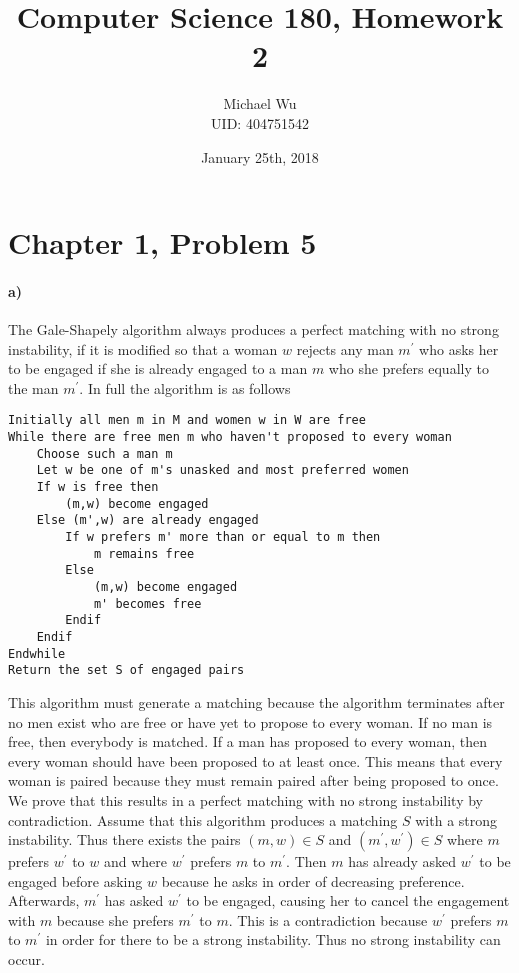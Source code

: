 \documentclass[12pt]{article}
\begin{document}
\title{Computer Science 180, Homework 2}
\date{January 25th, 2018}
\author{Michael Wu\\UID: 404751542}
\maketitle

\section*{Chapter 1, Problem 5}

\paragraph{a)}

The Gale-Shapely algorithm always produces a perfect matching with no strong instability,
if it is modified so that a woman \(w\) rejects any man \(m^\prime\) who asks her to be engaged
if she is already engaged to a man \(m\) who she prefers equally to the man \(m^\prime\).
In full the algorithm is as follows

\begin{verbatim}
Initially all men m in M and women w in W are free
While there are free men m who haven't proposed to every woman
    Choose such a man m
    Let w be one of m's unasked and most preferred women
    If w is free then
        (m,w) become engaged
    Else (m',w) are already engaged
        If w prefers m' more than or equal to m then
            m remains free
        Else
            (m,w) become engaged
            m' becomes free
        Endif
    Endif
Endwhile
Return the set S of engaged pairs
\end{verbatim}
This algorithm must generate a matching because the algorithm terminates after no men exist
who are free or have yet to propose to every woman. If no man is free, then everybody is matched.
If a man has proposed to every woman, then every woman should have been proposed to at least once.
This means that every woman is paired because they must remain paired after being proposed to once.
We prove that this results in a perfect matching with no strong instability by contradiction. Assume
that this algorithm produces a matching \(S\) with a strong instability. Thus there exists the pairs
\((m,w)\in S\) and \((m^\prime,w^\prime)\in S\) where \(m\) prefers \(w^\prime\) to \(w\) and where
\(w^\prime\) prefers \(m\) to \(m^\prime\). Then \(m\) has already asked \(w^\prime\) to be engaged
before asking \(w\) because he asks in order of decreasing preference. Afterwards, \(m^\prime\) has asked
\(w^\prime\) to be engaged, causing her to cancel the engagement with \(m\) because she prefers \(m^\prime\)
to \(m\). This is a contradiction because \(w^\prime\) prefers \(m\) to \(m^\prime\) in order for there to
be a strong instability. Thus no strong instability can occur.
\end{document}
